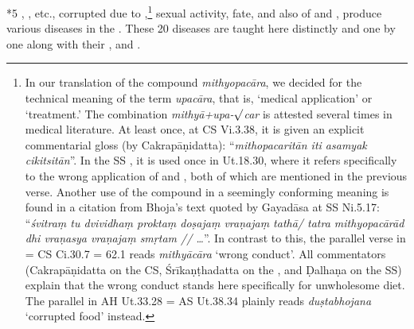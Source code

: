 \begin{translation}
         
    
    \item [*5] , , etc., corrupted due to
,\footnote{In our translation of
    the compound \emph{mithyopacāra}, we decided for the technical meaning of the
    term \emph{upacāra}, that is, `medical application' or `treatment.' The
    combination \emph{mithyā+upa-$\surd$car} is attested several times in
    medical literature. At least once, at CS Vi.3.38, it is given an explicit
    commentarial gloss (by Cakrapāṇidatta): ``\emph{mithopacaritān iti asamyak
        cikitsitān}''. In the SS \parencite{vulgate}, it is used once in Ut.18.30,
    where it refers specifically to the wrong application of
     and , both of which are
    mentioned in the previous verse. Another use of the compound in a seemingly
    conforming meaning is found in a citation from Bhoja's text quoted by Gayadāsa
    at SS Ni.5.17: ``\emph{śvitraṃ tu dvividhaṃ proktaṃ doṣajaṃ vraṇajaṃ tathā/
        tatra mithyopacārād dhi vraṇasya vraṇajaṃ smṛtam // \ldots}''. In contrast to
    this, the parallel verse in \cite{vulgate} = CS Ci.30.7 = \cite{madhava} 62.1
    reads \emph{mithyācāra} ‘wrong conduct’. All commentators (Cakrapāṇidatta on
    the CS, Śrīkaṇṭhadatta on the \cite{madhava}, and Ḍalhaṇa on the SS) explain
    that the wrong conduct stands here specifically for unwholesome diet. The
    parallel in AH Ut.33.28 = AS Ut.38.34 plainly reads \emph{duṣtabhojana}
    `corrupted food' instead.} sexual activity, fate, and also 
of  and , produce various diseases
in the . These 20 diseases are taught here
distinctly and one by one along with their ,
 and . %



\end{translation}
